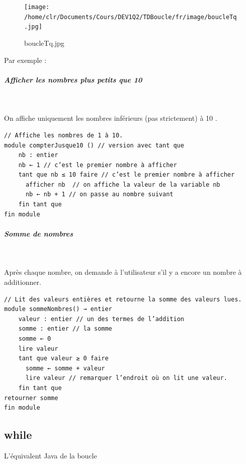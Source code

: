 \documentclass[11pt,a4paper]{article}
\begin{document}
            \par
        \begin{figure}[hbt]
				    \begin{center}
					\texttt{[image: /home/clr/Documents/Cours/DEV1Q2/TDBoucle/fr/image/boucleTq.jpg]}
						\end{center}
                
                    \caption[boucleTq.jpg]{boucleTq.jpg}
                \end{figure}
                    
            \par
        Par exemple : 
            \par
        
			
		\subparagraph{Afficher les nombres plus petits que 10} 
		
					\textcolor{white}{.} \par
				On affiche uniquement les nombres inf\'erieurs (pas strictement) \`a 10 .
            \par
        \begin{verbatim}
// Affiche les nombres de 1 à 10.
module compterJusque10 () // version avec tant que
    nb : entier
    nb ← 1 // c’est le premier nombre à afficher
    tant que nb ≤ 10 faire // c’est le premier nombre à afficher
      afficher nb  // on affiche la valeur de la variable nb
      nb ← nb + 1 // on passe au nombre suivant
    fin tant que
fin module
      \end{verbatim}
			
		\subparagraph{Somme de nombres} 
		
					\textcolor{white}{.} \par
				 Apr\`es chaque nombre, on demande \`a l'utilisateur s'il y a encore un nombre \`a additionner.
            \par
        \begin{verbatim}
// Lit des valeurs entières et retourne la somme des valeurs lues.
module sommeNombres() → entier
    valeur : entier // un des termes de l’addition
    somme : entier // la somme
    somme ← 0
    lire valeur
    tant que valeur ≥ 0 faire
      somme ← somme + valeur
      lire valeur // remarquer l’endroit où on lit une valeur.
    fin tant que
retourner somme
fin module
      \end{verbatim}\subsection{while}
		    L'\'equivalent Java de la boucle 
		  
\end{document}
